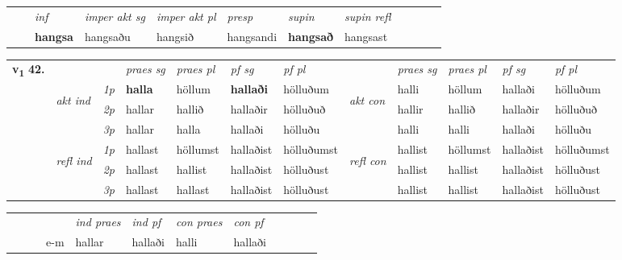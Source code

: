 \begin{tabular}{llllllllllll}
 & & \textit{inf} & \textit{imper akt sg} & \textit{imper akt pl}   & \textit{presp} & \textit{supin} & \textit{supin refl}      \\*
  & & \textbf{hangsa} & hangsaðu  & hangsið   & hangsandi &  \textbf{hangsað} & hangsast  \\*
\cmidrule{1-12}
\end{tabular}



\begin{tabular}{llllllllllll} \toprule
\multirow{4}{*}{{{\textbf{v{\textsubscript{1}}} \Large{\textbf{42.}}}}}  & &   &  \textit{praes sg}  & \textit{praes pl}  &\textit{ pf sg} & \textit{pf pl} &  &  \textit{praes sg}  & \textit{praes pl}  & \textit{pf sg} & \textit{pf pl } \\*
	\cmidrule{4-7} \cmidrule{9-12}
 & \multirow{3}{*}{\begin{turn}{90}\textit{akt ind}\end{turn}} & {\textit{1p}} & \textbf{halla} & höllum    & \textbf{hallaði} & hölluðum & \multirow{3}{*}{\begin{turn}{90}\textit{akt con}\end{turn}} &halli & höllum & hallaði & hölluðum\\*
& &  {\textit{2p}} &  hallar  & hallið   & hallaðir & hölluðuð & & hallir & hallið & hallaðir & hölluðuð \\*
& &  {\textit{3p}} & hallar & halla   & hallaði & hölluðu & & halli & halli& hallaði & hölluðu  \\*
\cmidrule{4-7} \cmidrule{9-12}
 &\multirow{3}{*}{\begin{turn}{90}\textit{refl ind}\end{turn}} & {\textit{1p}} & hallast & höllumst    & hallaðist & hölluðumst & \multirow{3}{*}{\begin{turn}{90}\textit{refl con}\end{turn}}  &hallist & höllumst & hallaðist & hölluðumst\\*
 &&  {\textit{2p}} &  hallast  & hallist   & hallaðist & hölluðust & &hallist & hallist & hallaðist & hölluðust \\*
& &  {\textit{3p}} & hallast & hallast   & hallaðist & hölluðust & & hallist & hallist& hallaðist & hölluðust  \\*
\cmidrule{4-7} \cmidrule{9-12}
\end{tabular}


\begin{tabular}{llllllllllll}
 & &  & &  \textit{ind praes} & \textit{ind pf} & \textit{con praes} & \textit{con pf} \\*
&  & & e-m & hallar & hallaði & halli & hallaði \\*
\cmidrule{5-9}
\end{tabular}


